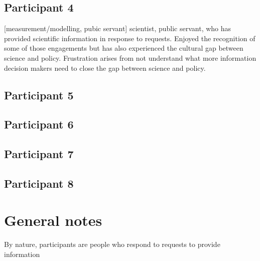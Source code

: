 \subsection{Participant 4}\label{sec:p4}
[measurement/modelling, pubic servant] scientist, public servant, who has provided scientific information in response to requests. Enjoyed the recognition of some of those engagements but has also experienced the cultural gap between science and policy. Frustration arises from not understand what more information decision makers need to close the gap between science and policy.
\subsection{Participant 5}\label{sec:p5}
\subsection{Participant 6}\label{sec:p6}
\subsection{Participant 7}\label{sec:p7}
\subsection{Participant 8}\label{sec:p8}

\section{General notes}
By nature, participants are people who respond to requests to provide information



